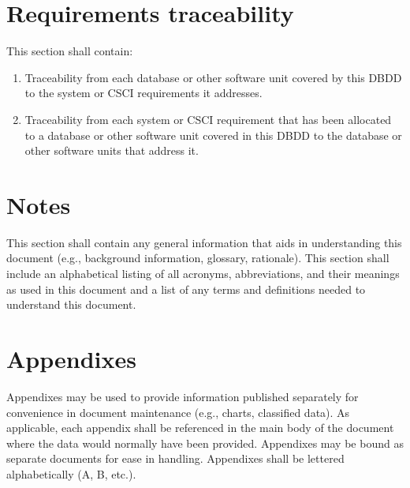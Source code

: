 \section{Requirements traceability}

This section shall contain:

\begin{enumerate}
\itemsep1pt\parskip0pt
\item
  Traceability from each database or other software unit covered by this
  DBDD to the system or CSCI requirements it addresses.
\item
  Traceability from each system or CSCI requirement that has been
  allocated to a database or other software unit covered in this DBDD to
  the database or other software units that address it.
\end{enumerate}

\section{Notes}

This section shall contain any general information that aids in
understanding this document (e.g., background information, glossary,
rationale). This section shall include an alphabetical listing of all
acronyms, abbreviations, and their meanings as used in this document and
a list of any terms and definitions needed to understand this document.

\appendix

\section{Appendixes}

Appendixes may be used to provide information published separately for
convenience in document maintenance (e.g., charts, classified data). As
applicable, each appendix shall be referenced in the main body of the
document where the data would normally have been provided. Appendixes
may be bound as separate documents for ease in handling. Appendixes
shall be lettered alphabetically (A, B, etc.).
